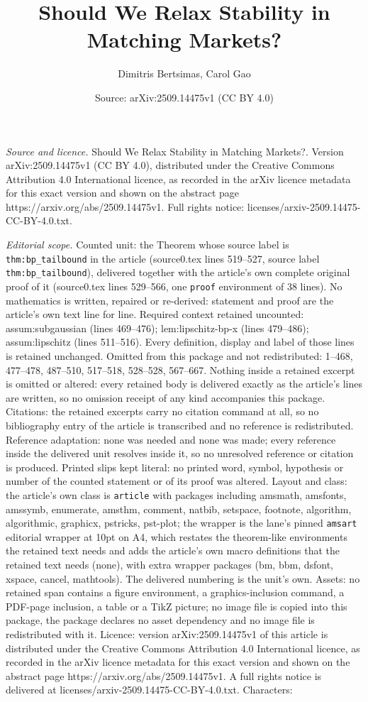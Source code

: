 \documentclass[10pt,a4paper]{amsart}
\title[Should We Relax Stability in Matching Markets?]{Should We Relax Stability in Matching Markets?}
\author{Dimitris Bertsimas, Carol Gao}
\date{Source: arXiv:2509.14475v1 (CC BY 4.0)}
\begin{document}
\maketitle

\noindent\emph{Source and licence.} Should We Relax Stability in Matching Markets?. Version arXiv:2509.14475v1 (CC BY 4.0), distributed under the Creative Commons Attribution 4.0 International licence, as recorded in the arXiv licence metadata for this exact version and shown on the abstract page https://arxiv.org/abs/2509.14475v1. Full rights notice: licenses/arxiv-2509.14475-CC-BY-4.0.txt.\par\smallskip

\noindent\textit{Editorial scope.} Counted unit: the Theorem whose source label is \texttt{thm:bp\_tailbound} in the article (source0.tex lines 519--527, source label \texttt{thm:bp\_tailbound}), delivered together with the article's own complete original proof of it (source0.tex lines 529--566, one \texttt{proof} environment of 38 lines). No mathematics is written, repaired or re-derived: statement and proof are the article's own text line for line. Required context retained uncounted: assum:subgaussian (lines 469--476); lem:lipschitz-bp-x (lines 479--486); assum:lipschitz (lines 511--516). Every definition, display and label of those lines is retained unchanged. Omitted from this package and not redistributed: 1--468, 477--478, 487--510, 517--518, 528--528, 567--667. Nothing inside a retained excerpt is omitted or altered: every retained body is delivered exactly as the article's lines are written, so no omission receipt of any kind accompanies this package. Citations: the retained excerpts carry no citation command at all, so no bibliography entry of the article is transcribed and no reference is redistributed. Reference adaptation: none was needed and none was made; every reference inside the delivered unit resolves inside it, so no unresolved reference or citation is produced. Printed slips kept literal: no printed word, symbol, hypothesis or number of the counted statement or of its proof was altered. Layout and class: the article's own class is \texttt{article} with packages including amsmath, amsfonts, amssymb, enumerate, amsthm, comment, natbib, setspace, footnote, algorithm, algorithmic, graphicx, pstricks, pst-plot; the wrapper is the lane's pinned \texttt{amsart} editorial wrapper at 10pt on A4, which restates the theorem-like environments the retained text needs and adds the article's own macro definitions that the retained text needs (none), with extra wrapper packages (bm, bbm, dsfont, xspace, cancel, mathtools). The delivered numbering is the unit's own. Assets: no retained span contains a figure environment, a graphics-inclusion command, a PDF-page inclusion, a table or a TikZ picture; no image file is copied into this package, the package declares no asset dependency and no image file is redistributed with it. Licence: version arXiv:2509.14475v1 of this article is distributed under the Creative Commons Attribution 4.0 International licence, as recorded in the arXiv licence metadata for this exact version and shown on the abstract page https://arxiv.org/abs/2509.14475v1. A full rights notice is delivered at licenses/arxiv-2509.14475-CC-BY-4.0.txt. Characters: 
\end{document}
